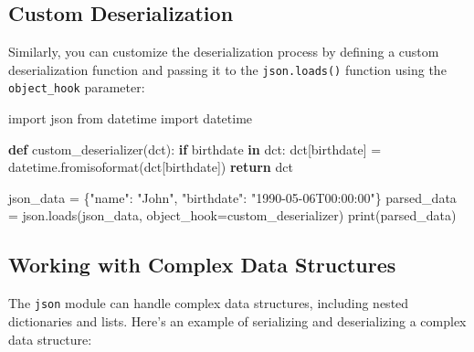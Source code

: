 \documentclass[
  letterpaper,
  DIV=11,
  numbers=noendperiod]{scrreprt}
\newenvironment{Shaded}{\begin{snugshade}}{\end{snugshade}}
\newcommand{\BuiltInTok}[1]{\textcolor[rgb]{0.00,0.23,0.31}{#1}}
\newcommand{\ControlFlowTok}[1]{\textcolor[rgb]{0.00,0.23,0.31}{\textbf{#1}}}
\newcommand{\ImportTok}[1]{\textcolor[rgb]{0.00,0.46,0.62}{#1}}
\newcommand{\KeywordTok}[1]{\textcolor[rgb]{0.00,0.23,0.31}{\textbf{#1}}}
\newcommand{\NormalTok}[1]{\textcolor[rgb]{0.00,0.23,0.31}{#1}}
\newcommand{\OperatorTok}[1]{\textcolor[rgb]{0.37,0.37,0.37}{#1}}
\newcommand{\StringTok}[1]{\textcolor[rgb]{0.13,0.47,0.30}{#1}}
\begin{document}
\subsection{Custom Deserialization}\label{custom-deserialization}

Similarly, you can customize the deserialization process by defining a
custom deserialization function and passing it to the
\texttt{json.loads()} function using the \texttt{object\_hook}
parameter:

\begin{Shaded}
\begin{Highlighting}[]
\ImportTok{import}\NormalTok{ json}
\ImportTok{from}\NormalTok{ datetime }\ImportTok{import}\NormalTok{ datetime}

\KeywordTok{def}\NormalTok{ custom\_deserializer(dct):}
    \ControlFlowTok{if} \StringTok{\textquotesingle{}birthdate\textquotesingle{}} \KeywordTok{in}\NormalTok{ dct:}
\NormalTok{        dct[}\StringTok{\textquotesingle{}birthdate\textquotesingle{}}\NormalTok{] }\OperatorTok{=}\NormalTok{ datetime.fromisoformat(dct[}\StringTok{\textquotesingle{}birthdate\textquotesingle{}}\NormalTok{])}
    \ControlFlowTok{return}\NormalTok{ dct}

\NormalTok{json\_data }\OperatorTok{=} \StringTok{\textquotesingle{}\{"name": "John", "birthdate": "1990{-}05{-}06T00:00:00"\}\textquotesingle{}}
\NormalTok{parsed\_data }\OperatorTok{=}\NormalTok{ json.loads(json\_data, object\_hook}\OperatorTok{=}\NormalTok{custom\_deserializer)}
\BuiltInTok{print}\NormalTok{(parsed\_data)}
\end{Highlighting}
\end{Shaded}

\subsection{Working with Complex Data
Structures}\label{working-with-complex-data-structures}

The \texttt{json} module can handle complex data structures, including
nested dictionaries and lists. Here's an example of serializing and
deserializing a complex data structure:
\end{document}
